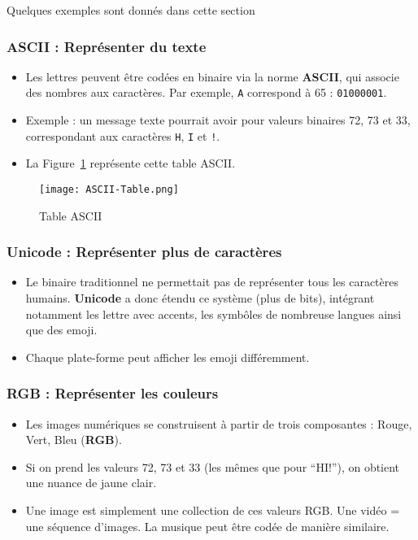Quelques exemples sont donnés dans cette section
\subsubsection{ASCII : Représenter du texte}

\begin{itemize}
	\item Les lettres peuvent être codées en binaire via la norme \textbf{ASCII}, qui associe des nombres aux caractères. Par exemple, \texttt{A} correspond à 65 : \texttt{01000001}.
	\item Exemple : un message texte pourrait avoir pour valeurs binaires 72, 73 et 33, correspondant aux caractères \texttt{H}, \texttt{I} et \texttt{!}.
	\item La Figure~\ref{table-ascii} représente cette table ASCII.
\end{itemize}

\begin{figure}[h!t]
	\centering
	\texttt{[image: ASCII-Table.png]}
	\caption{Table ASCII}
	\label{table-ascii}
\end{figure}

\subsubsection{Unicode : Représenter plus de caractères}

\begin{itemize}
	\item Le binaire traditionnel ne permettait pas de représenter tous les caractères humains. \textbf{Unicode} a donc étendu ce système (plus de bits), intégrant notamment les lettre avec accents, les symbôles de nombreuse langues ainsi que des emoji.
	\item Chaque plate-forme peut afficher les emoji différemment.
\end{itemize}

\subsubsection{RGB : Représenter les couleurs}

\begin{itemize}
	\item Les images numériques se construisent à partir de trois composantes : Rouge, Vert, Bleu (\textbf{RGB}).
	\item Si on prend les valeurs 72, 73 et 33 (les mêmes que pour “HI!”), on obtient une nuance de jaune clair.
	\item Une image est simplement une collection de ces valeurs RGB. Une vidéo = une séquence d’images. La musique peut être codée de manière similaire.
\end{itemize}


